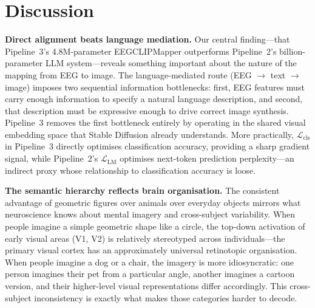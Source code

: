 \documentclass{article}
\begin{document}
\section{Discussion}

\textbf{Direct alignment beats language mediation.} Our central finding---that Pipeline~3's 4.8M-parameter EEGCLIPMapper outperforms Pipeline~2's billion-parameter LLM system---reveals something important about the nature of the mapping from EEG to image. The language-mediated route (EEG $\to$ text $\to$ image) imposes two sequential information bottlenecks: first, EEG features must carry enough information to specify a natural language description, and second, that description must be expressive enough to drive correct image synthesis. Pipeline~3 removes the first bottleneck entirely by operating in the shared visual embedding space that Stable Diffusion already understands. More practically, $\mathcal{L}_\mathrm{cls}$ in Pipeline~3 directly optimises classification accuracy, providing a sharp gradient signal, while Pipeline~2's $\mathcal{L}_\mathrm{LM}$ optimises next-token prediction perplexity---an indirect proxy whose relationship to classification accuracy is loose.

\textbf{The semantic hierarchy reflects brain organisation.} The consistent advantage of geometric figures over animals over everyday objects mirrors what neuroscience knows about mental imagery and cross-subject variability. When people imagine a simple geometric shape like a circle, the top-down activation of early visual areas (V1, V2) is relatively stereotyped across individuals---the primary visual cortex has an approximately universal retinotopic organisation. When people imagine a dog or a chair, the imagery is more idiosyncratic: one person imagines their pet from a particular angle, another imagines a cartoon version, and their higher-level visual representations differ accordingly. This cross-subject inconsistency is exactly what makes those categories harder to decode.
\end{document}
